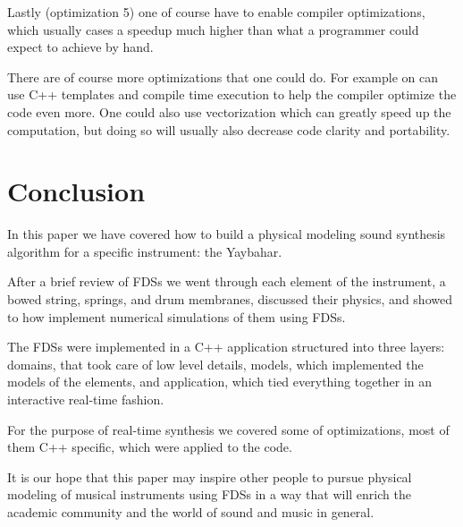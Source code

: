 \documentclass{article}
\begin{document}
Lastly (optimization 5) one of course have to enable compiler optimizations, which usually cases a speedup much higher than what a programmer could expect to achieve by hand.

There are of course more optimizations that one could do.
For example on can use C++ templates and compile time execution to help the compiler optimize the code even more.
One could also use vectorization which can greatly speed up the computation, but doing so will usually also decrease code clarity and portability. 

\section{Conclusion}
\label{sec:conclusion}

In this paper we have covered how to build a physical modeling sound synthesis algorithm for a specific instrument: the Yaybahar.

After a brief review of FDSs we went through each element of the instrument, a bowed string, springs, and drum membranes, discussed their physics, and showed to how implement numerical simulations of them using FDSs.

The FDSs were implemented in a C++ application structured into three layers: domains, that took care of low level details, models, which implemented the models of the elements, and application, which tied everything together in an interactive real-time fashion.

For the purpose of real-time synthesis we covered some of optimizations, most of them C++ specific, which were applied to the code.

It is our hope that this paper may inspire other people to pursue physical modeling of musical instruments using FDSs in a way that will enrich the academic community and the world of sound and music in general.


\end{document}

